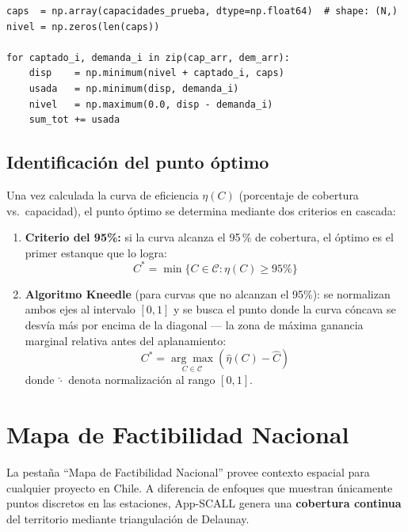 \documentclass[12pt, a4paper]{article}
\begin{document}
\begin{lstlisting}[caption={Núcleo vectorizado de la curva de optimización}]
caps  = np.array(capacidades_prueba, dtype=np.float64)  # shape: (N,)
nivel = np.zeros(len(caps))

for captado_i, demanda_i in zip(cap_arr, dem_arr):
    disp    = np.minimum(nivel + captado_i, caps)
    usada   = np.minimum(disp, demanda_i)
    nivel   = np.maximum(0.0, disp - demanda_i)
    sum_tot += usada
\end{lstlisting}

\subsection{Identificación del punto óptimo}

Una vez calculada la curva de eficiencia $\eta(C)$ (porcentaje de cobertura vs.\ capacidad), el punto óptimo se determina mediante dos criterios en cascada:

\begin{enumerate}
    \item \textbf{Criterio del 95\%:} si la curva alcanza el 95\,\% de cobertura, el óptimo es el primer estanque que lo logra:
    \begin{equation}
        C^* = \min\{C \in \mathcal{C} : \eta(C) \geq 95\%\}
    \end{equation}

    \item \textbf{Algoritmo Kneedle} (para curvas que no alcanzan el 95\%): se normalizan ambos ejes al intervalo $[0,1]$ y se busca el punto donde la curva cóncava se desvía más por encima de la diagonal --- la zona de máxima ganancia marginal relativa antes del aplanamiento:
    \begin{equation}
        C^* = \underset{C \in \mathcal{C}}{\arg\max}\left(\hat{\eta}(C) - \hat{C}\right)
    \end{equation}
    donde $\hat{\cdot}$ denota normalización al rango $[0,1]$.
\end{enumerate}

\section{Mapa de Factibilidad Nacional}

La pestaña ``Mapa de Factibilidad Nacional'' provee contexto espacial para cualquier proyecto en Chile. A diferencia de enfoques que muestran únicamente puntos discretos en las estaciones, App-SCALL genera una \textbf{cobertura continua} del territorio mediante triangulación de Delaunay.
\end{document}
